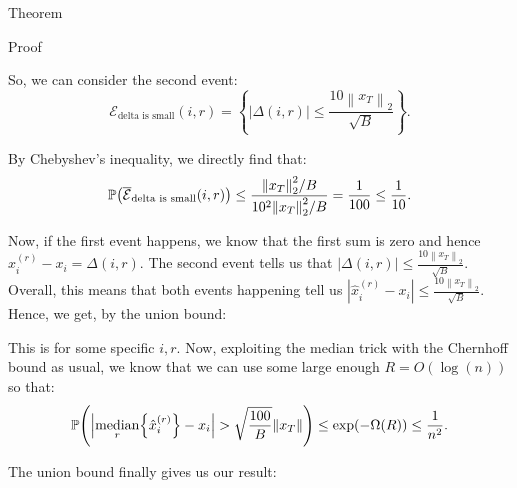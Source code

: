 \documentclass[a4paper]{article}
\begin{document}
\begin{parag}{Theorem}
\begin{subparag}{Proof}
\begin{enumerate}[left=0pt]
        So, we can consider the second event:
        \[\mathcal{E}_{\text{delta is small}}\left(i, r\right) = \left\{\left|\Delta\left(i, r\right)\right| \leq \frac{10 \left\|x_T\right\|_2}{\sqrt{B}}\right\}.\]

        By Chebyshev's inequality, we directly find that: 
        \[\prob\left(\bar{\mathcal{E}}_{\text{delta is small}}\left(i, r\right)\right) \leq \frac{\left\|x_T\right\|_2^2 / B}{10^2 \left\|x_T\right\|_2^2 / B} = \frac{1}{100} \leq \frac{1}{10}.\]
        
        \end{enumerate}

        Now, if the first event happens, we know that the first sum is zero and hence $\hat{x}_i^{\left(r\right)} - x_i = \Delta\left(i, r\right)$. The second event tells us that $\left|\Delta\left(i, r\right)\right| \leq \frac{10 \left\|x_T\right\|_2}{\sqrt{B}}$. Overall, this means that both events happening tell us $\left|\hat{x}_i^{\left(r\right)} - x_i\right| \leq \frac{10 \left\|x_T\right\|_2}{\sqrt{B}}$. Hence, we get, by the union bound: 

        This is for some specific $i, r$. Now, exploiting the median trick with the Chernhoff bound as usual, we know that we can use some large enough $R = O\left(\log\left(n\right)\right)$ so that:
        \[\prob\left(\left|\median_r\left\{\hat{x}_i^{\left(r\right)}\right\} - x_i\right| > \sqrt{\frac{100}{B}} \left\|x_T\right\|\right) \leq \exp\left(-\Omega\left(R\right)\right) \leq \frac{1}{n^2}.\]
                
        The union bound finally gives us our result:



\end{subparag}
\end{parag}
\end{document}
